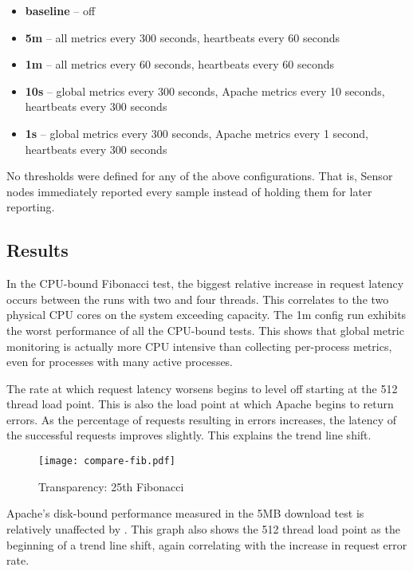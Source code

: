\begin{itemize}
\item \textbf{baseline} -- \dcamp off
\item \textbf{5m} -- all metrics every 300 seconds, heartbeats every 60 seconds
\item \textbf{1m} -- all metrics every 60 seconds, heartbeats every 60 seconds
\item \textbf{10s} -- global metrics every 300 seconds, Apache metrics every 10 seconds, heartbeats every 300 seconds
\item \textbf{1s} -- global metrics every 300 seconds, Apache metrics every 1 second, heartbeats every 300 seconds
\end{itemize}

No thresholds were defined for any of the above configurations. That is, Sensor nodes immediately reported every sample
instead of holding them for later reporting.

\subsection{Results}

In the CPU-bound Fibonacci test, the biggest relative increase in request latency occurs between the runs with two and
four threads. This correlates to the two physical CPU cores on the system exceeding capacity. The 1m config run exhibits
the worst performance of all the CPU-bound tests. This shows that global metric monitoring is actually more CPU
intensive than collecting per-process metrics, even for processes with many active processes.

The rate at which request latency worsens begins to level off starting at the 512 thread load point. This is also the
load point at which Apache begins to return errors. As the percentage of requests resulting in errors increases, the
latency of the successful requests improves slightly. This explains the trend line shift.

\begin{figure}[H]
    \centering
    \vspace{-20pt}
    \texttt{[image: compare-fib.pdf]}
    \vspace{-50pt}
    \caption{Transparency: 25th Fibonacci}
    \label{fig:fib25_graph}
\end{figure}

Apache's disk-bound performance measured in the 5MB download test is relatively unaffected by \dcamp. This graph also
shows the 512 thread load point as the beginning of a trend line shift, again correlating with the increase in request
error rate.

